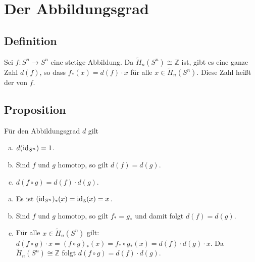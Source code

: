 \section*{Der Abbildungsgrad}

\subsection[Definition: Abbildungsgrad einer stetigen Abbildung $f \colon S^n \to S^n$]{Definition} %
\label{sub:103}
Sei $f \colon S^n \to S^n$ eine stetige Abbildung. 
Da $\tilde{H}_n(S^n) \cong \mathds{Z}$ ist, gibt es eine ganze Zahl $d(f)$, so dass $f_*(x)= d(f) \cdot x$ für alle 
$x \in \tilde{H}_n(S^n)$. Diese Zahl heißt der  von $f$. 

\subsection[Proposition: Einfache Eigenschaften des Abbildungsgrades]{Proposition} %
\label{sub:104}
Für den Abbildungsgrad $d$ gilt
\begin{enumerate}[a)]
	\item $d(\operatorname{id}_{S^n}) = 1$.
	\item Sind $f$ und $g$ homotop, so gilt $d(f)=d(g)$.
	\item $d(f \circ g) = d(f) \cdot d(g)$.
\end{enumerate}
\begin{enumerate}[a)]
	\item Es ist $(\operatorname{id}_{S^n})_*(x)= \operatorname{id}_{\mathbb{Z}}(x)= x$.
	\item Sind $f$ und $g$ homotop, so gilt $f_*=g_*$ und damit folgt $d(f)=d(g)$.
	\item Für alle $x \in \tilde{H}_n(S^n)$ gilt: $d(f \circ g) \cdot x = (f \circ g)_* (x) = f_* \circ g_*(x)= d(f) \cdot d(g) \cdot x$. Da 
	$\tilde{H}_n(S^n) \cong \mathds{Z}$ folgt $d(f \circ g) = d(f) \cdot d(g)$. \bewende
\end{enumerate}


